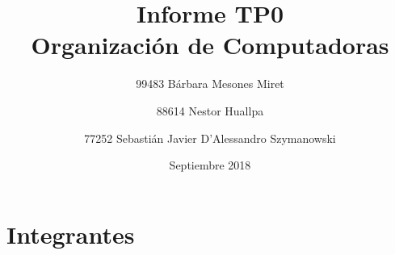 \documentclass{article}
\title{Informe TP0\\
\large Organización de Computadoras}
\date{Septiembre 2018}
\begin{document}
\maketitle

\section{Integrantes}
\begin{flushleft}

\author{99483 Bárbara Mesones Miret}\break\break
\author{88614 Nestor Huallpa}\break\break
\author{77252 Sebastián Javier D'Alessandro Szymanowski}\break\break

\end{flushleft}
\end{document}
